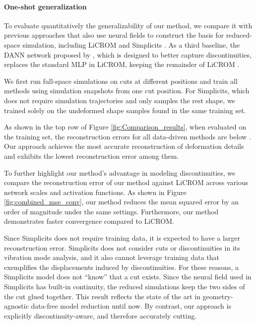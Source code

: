 \vspace{-0.1cm}
\paragraph{One-shot generalization}
To evaluate quantitatively the generalizability of our method, we compare it with previous approaches that also use neural fields to construct the basis for reduced-space simulation, including LiCROM \cite{chang:2023:licrom} and Simplicits \cite{Modi:2024:Simplicits}. As a third baseline, the DANN network proposed by \citet{Belhe:2023:DiscontinuityAwareNeuralFields}, which is designed to better capture discontinuities, replaces the standard MLP in LiCROM, keeping the remainder of LiCROM .

We first run full-space simulations on cuts at different positions and train all methods using simulation snapshots from one cut position. For Simplicits, which does not require simulation trajectories and only samples the rest shape, we trained solely on the undeformed shape samples found in the same training set.

As shown in the top row of Figure \ref{fig:Comparison_results}, when evaluated on the training set, the reconstruction errors for all data-driven methods are below . Our approach achieves the most accurate reconstruction of deformation details and exhibits the lowest reconstruction error among them. 

To further highlight our method's advantage in modeling discontinuities, we compare the reconstruction error of our method against LiCROM \cite{chang:2023:licrom} across various network scales and activation functions. As shown in Figure \ref{fig:combined_mse_conv}, our method reduces the mean squared error by an order of magnitude under the same settings. Furthermore, our method demonstrates faster convergence compared to LiCROM.

Since Simplicits  does not require training data, it is expected to have a larger reconstruction error. Simplicits does not consider cuts or discontinuities in its vibration mode analysis, and it also cannot leverage training data that exemplifies the displacements induced by discontinuities. For these reasons, a Simplicits model does not ``know'' that a cut exists. Since the neural field used in Simplicits has built-in continuity, the reduced simulations keep the two sides of the cut glued together. This result reflects the state of the art in geometry-agnostic data-free model reduction until now. By contrast, our approach is explicitly discontinuity-aware, and therefore accurately  cutting. 



